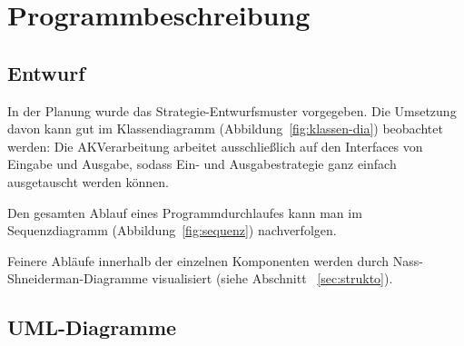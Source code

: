 \chapter{Programmbeschreibung}\label{ch:programmbeschreibung}

\section{Entwurf}\label{sec:entwurf}
In der Planung wurde das Strategie-Entwurfsmuster vorgegeben.
Die Umsetzung davon kann gut im Klassendiagramm (Abbildung~\ref{fig:klassen-dia}) beobachtet werden:
Die AKVerarbeitung arbeitet ausschließlich auf den Interfaces von Eingabe und Ausgabe, sodass Ein- und Ausgabestrategie ganz einfach ausgetauscht werden können.

Den gesamten Ablauf eines Programmdurchlaufes kann man im Sequenzdiagramm (Abbildung~\ref{fig:sequenz}) nachverfolgen.

Feinere Abläufe innerhalb der einzelnen Komponenten werden durch Nass-Shneiderman-Diagramme visualisiert (siehe Abschnitt ~\ref{sec:strukto}).
\pagebreak

\section{UML-Diagramme}\label{sec:uml}

\noindent%
\begin{minipage}{\linewidth}%
    \label{fig:klassen-dia}
\end{minipage}

